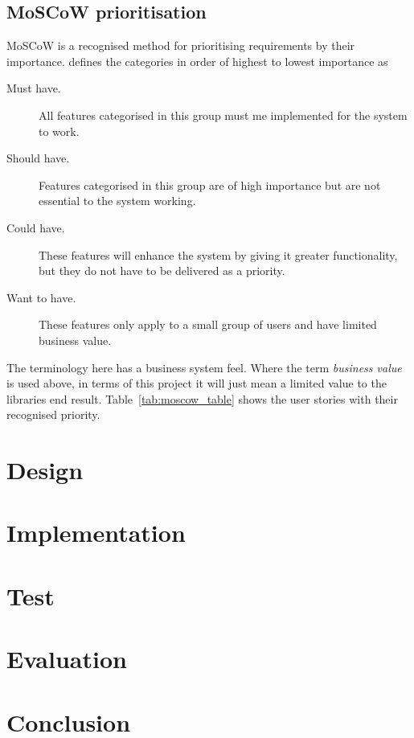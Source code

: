 \documentclass[11pt,oneside]{report}
\begin{document}
		\section{MoSCoW prioritisation}
			MoSCoW is a recognised method for prioritising requirements by their importance.  defines the categories in order of highest to lowest importance as
			\begin{description}
				\item[Must have. ] All features categorised in this group must me implemented for the system to work.
				\item[Should have. ] Features categorised in this group are of high importance but are not essential to the system working.
				\item[Could have. ] These features will enhance the system by giving it greater functionality, but they do not have to be delivered as a priority.
				\item[Want to have. ] These features only apply to a small group of users and have limited business value.
			\end{description}
			The terminology here has a business system feel.
			Where the term \textit{business value} is used above, in terms of this project it will just mean a limited value to the libraries end result.
			Table~\ref{tab:moscow_table} shows the user stories with their recognised priority.
			

    		
	
	\chapter{Design}\label{chap:des}
	
	\chapter{Implementation}\label{chap:imp}
	
	\chapter{Test}\label{chap:test}
	
	\chapter{Evaluation}\label{chap:eval}
	
	\chapter{Conclusion}\label{chap:concl}

	
	
\end{document}
